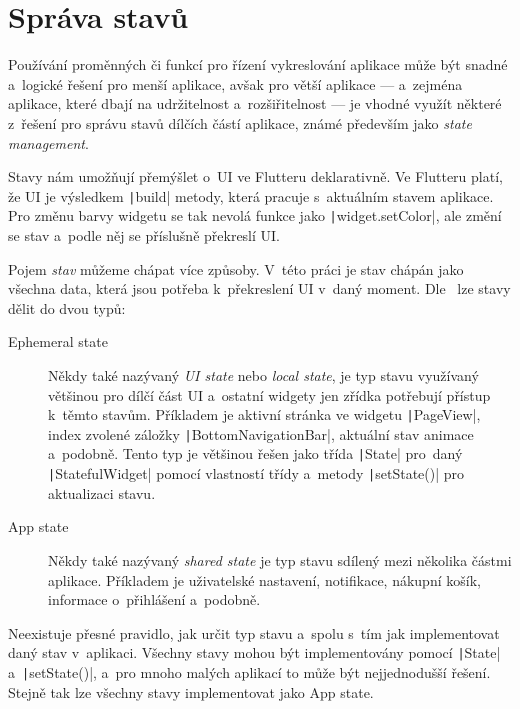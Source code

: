 \section{Správa stavů}

Používání proměnných či funkcí pro řízení vykreslování aplikace může být
snadné a~logické řešení pro menší aplikace,
avšak pro větší aplikace
--- a~zejména aplikace, které dbají na udržitelnost a~rozšiřitelnost ---
je vhodné využít některé z~řešení pro správu stavů dílčích částí aplikace,
známé především jako \emph{state management}.

Stavy nám umožňují přemýšlet o~UI ve Flutteru deklarativně.
Ve Flutteru platí,
že UI je výsledkem \texttt|build| metody,
která pracuje s~aktuálním stavem aplikace.
Pro změnu barvy widgetu se tak nevolá funkce jako
\texttt|widget.setColor|,
ale změní se stav a~podle něj se příslušně
překreslí UI.~\cite{flutter_state_mgmt_declarative}

Pojem \emph{stav} můžeme chápat více způsoby.
V~této práci je stav chápán jako všechna data,
která jsou potřeba k~překreslení UI
v~daný moment.
Dle~\cite{flutter_state_mgmt_ephemeral_vs_app} lze stavy dělit do dvou typů:

\begin{description}
    \item[Ephemeral state] Někdy také nazývaný \emph{UI state} nebo
    \emph{local state},
    je typ stavu využívaný většinou pro dílčí část UI
    a~ostatní widgety jen zřídka potřebují přístup k~těmto stavům.
    Příkladem je aktivní stránka ve widgetu \texttt|PageView|,
    index zvolené záložky \texttt|BottomNavigationBar|,
    aktuální stav animace a~podobně.
    Tento typ je většinou řešen jako třída \texttt|State| pro~daný
    \texttt|StatefulWidget| pomocí vlastností třídy a~metody
    \texttt|setState()| pro aktualizaci stavu.
    \item[App state] Někdy také nazývaný \emph{shared state} je typ stavu
    sdílený mezi několika částmi aplikace.
    Příkladem je uživatelské nastavení, notifikace, nákupní košík,
    informace o~přihlášení a~podobně.
\end{description}

Neexistuje přesné pravidlo,
jak určit typ stavu a~spolu s~tím jak implementovat daný stav v~aplikaci.
Všechny stavy mohou být implementovány pomocí \texttt|State|
a~\texttt|setState()|,
a~pro mnoho malých aplikací to může být nejjednodušší řešení.
Stejně tak lze všechny stavy implementovat jako
App state.~\cite{flutter_state_mgmt_ephemeral_vs_app}

